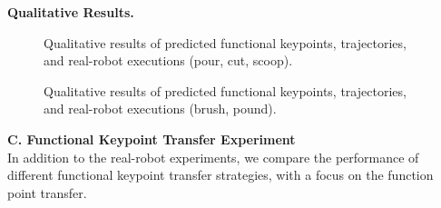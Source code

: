 \noindent \textbf{Qualitative Results.} 

\begin{figure}[h]
  \centering
    \vspace*{-0.2in}
  \caption{Qualitative results of predicted functional keypoints, trajectories, and real-robot executions (pour, cut, scoop).}
  \label{fig:qualitative_1}
\end{figure}

\newpage

\begin{figure}[h]
  \centering
    \vspace*{-0.2in}
  \caption{Qualitative results of predicted functional keypoints, trajectories, and real-robot executions (brush, pound).}
  \label{fig:qualitative_2}
\end{figure}








\newpage

\noindent \textbf{C. Functional Keypoint Transfer Experiment} \\
In addition to the real-robot experiments, we compare the performance of different functional keypoint transfer strategies, with a focus on the function point transfer. \\

